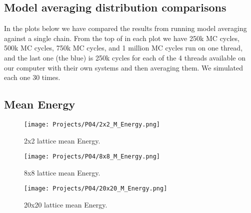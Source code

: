 \documentclass[a4paper]{article}
\begin{document}
\begin{appendix}
\newpage
\section{Model averaging distribution comparisons}
\label{section:Boxplots}

In the plots below we have compared the results from running model averaging against a single chain. From the top of in each plot we have 250k MC cycles, 500k MC cycles, 750k MC cycles, and 1 million MC cycles run on one thread, and the last one (the blue) is 250k cycles for each of the 4 threads available on our computer with their own systems and then averaging them. We simulated each one 30 times.


\subsection*{Mean Energy}

\begin{figure}[H]
  \centering
  \texttt{[image: Projects/P04/2x2\_M\_Energy.png]}
  \caption{2x2 lattice mean Energy.}
  \label{2x2_M_Energy}
\end{figure}
\begin{figure}[H]
  \centering
  \texttt{[image: Projects/P04/8x8\_M\_Energy.png]}
  \caption{8x8 lattice mean Energy.}
  \label{8x8_M_Energy}
\end{figure}
\begin{figure}[H]
  \centering
  \texttt{[image: Projects/P04/20x20\_M\_Energy.png]}
  \caption{20x20 lattice mean Energy.}
  \label{20x20_M_Energy}
\end{figure}





\end{appendix}
\end{document}
